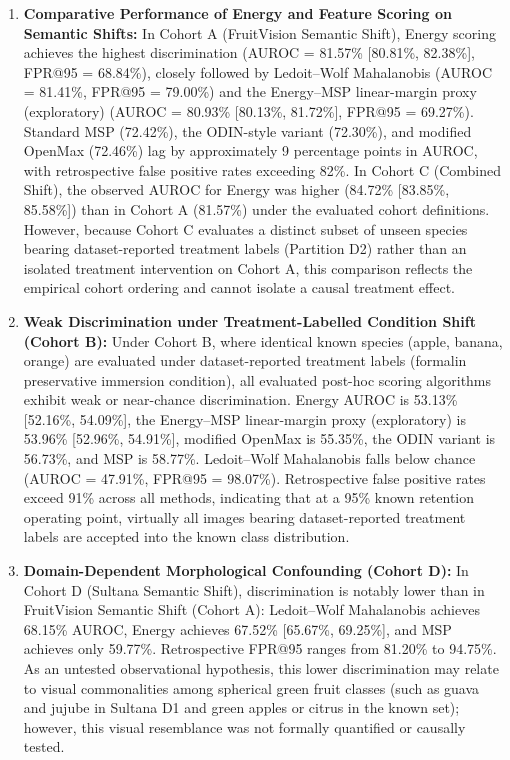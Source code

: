 \begin{enumerate}
\setlength{\itemsep}{0pt}
\setlength{\parsep}{0pt}
\setlength{\parskip}{0pt}
\setlength{\topsep}{1pt}
\setlength{\partopsep}{0pt}
\item \textbf{Comparative Performance of Energy and Feature Scoring on Semantic Shifts:} In Cohort A (FruitVision Semantic Shift), Energy scoring achieves the highest discrimination (AUROC = 81.57\% [80.81\%, 82.38\%], FPR@95 = 68.84\%), closely followed by Ledoit--Wolf Mahalanobis (AUROC = 81.41\%, FPR@95 = 79.00\%) and the Energy--MSP linear-margin proxy (exploratory) (AUROC = 80.93\% [80.13\%, 81.72\%], FPR@95 = 69.27\%). Standard MSP (72.42\%), the ODIN-style variant (72.30\%), and modified OpenMax (72.46\%) lag by approximately 9 percentage points in AUROC, with retrospective false positive rates exceeding 82\%. In Cohort C (Combined Shift), the observed AUROC for Energy was higher (84.72\% [83.85\%, 85.58\%]) than in Cohort A (81.57\%) under the evaluated cohort definitions. However, because Cohort C evaluates a distinct subset of unseen species bearing dataset-reported treatment labels (Partition D2) rather than an isolated treatment intervention on Cohort A, this comparison reflects the empirical cohort ordering and cannot isolate a causal treatment effect.
\item \textbf{Weak Discrimination under Treatment-Labelled Condition Shift (Cohort B):} Under Cohort B, where identical known species (apple, banana, orange) are evaluated under dataset-reported treatment labels (formalin preservative immersion condition), all evaluated post-hoc scoring algorithms exhibit weak or near-chance discrimination. Energy AUROC is 53.13\% [52.16\%, 54.09\%], the Energy--MSP linear-margin proxy (exploratory) is 53.96\% [52.96\%, 54.91\%], modified OpenMax is 55.35\%, the ODIN variant is 56.73\%, and MSP is 58.77\%. Ledoit--Wolf Mahalanobis falls below chance (AUROC = 47.91\%, FPR@95 = 98.07\%). Retrospective false positive rates exceed 91\% across all methods, indicating that at a 95\% known retention operating point, virtually all images bearing dataset-reported treatment labels are accepted into the known class distribution.
\item \textbf{Domain-Dependent Morphological Confounding (Cohort D):} In Cohort D (Sultana Semantic Shift), discrimination is notably lower than in FruitVision Semantic Shift (Cohort A): Ledoit--Wolf Mahalanobis achieves 68.15\% AUROC, Energy achieves 67.52\% [65.67\%, 69.25\%], and MSP achieves only 59.77\%. Retrospective FPR@95 ranges from 81.20\% to 94.75\%. As an untested observational hypothesis, this lower discrimination may relate to visual commonalities among spherical green fruit classes (such as guava and jujube in Sultana D1 and green apples or citrus in the known set); however, this visual resemblance was not formally quantified or causally tested.

\end{enumerate}
